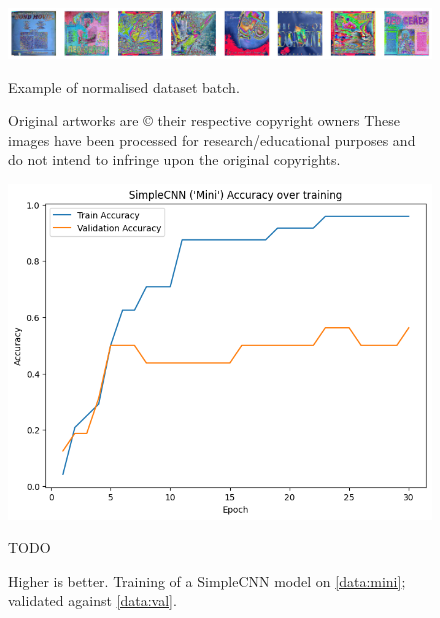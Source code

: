             \begin{figure}[h]
                \centering
                \includegraphics[width=\textwidth]{images/NormalisedArts.png}
                \caption{Example of normalised dataset batch.}
                \label{fig:normalisedArts}
                \caption*{
                    Original artworks are © their respective copyright owners
                    \footnotesize These images have been processed for research/educational purposes and do not intend to infringe upon the original copyrights.
                }
            \end{figure}
    
            \begin{figure}[h]
                \centering
                \includegraphics[width=\textwidth]{images/SimpleCNN-Mini_Train.png}
                \caption{TODO}
                \label{fig:SimpleCNN-Mini_Train}
                \caption*{Higher is better. Training of a SimpleCNN model on \ref{data:mini}; validated against \ref{data:val}.}
            \end{figure}
    
